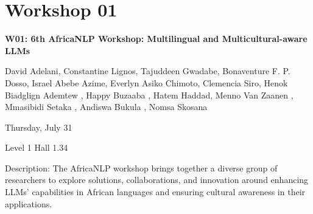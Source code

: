 
\clearpage



\section[W01: 6th AfricaNLP Workshop: Multilingual and Multicultural-aware LLMs]{Workshop 01}

\begin{center}
    {\Large \textbf{W01: 6th AfricaNLP Workshop: Multilingual and Multicultural-aware LLMs}}

    David Adelani, Constantine Lignos, Tajuddeen Gwadabe, Bonaventure F. P. Dosso, Israel Abebe Azime, Everlyn Asiko Chimoto, Clemencia Siro, Henok Biadglign Ademtew , Happy Buzaaba , Hatem Haddad, Menno Van Zaanen , Mmasibidi Setaka , Andiswa Bukula , Nomsa Skosana

    Thursday, July 31
    
    Level 1 Hall 1.34

\end{center}

Description: The AfricaNLP workshop brings together a diverse group of researchers to explore solutions, collaborations, and innovation around enhancing LLMs’ capabilities in African languages and ensuring cultural awareness in their applications. 

